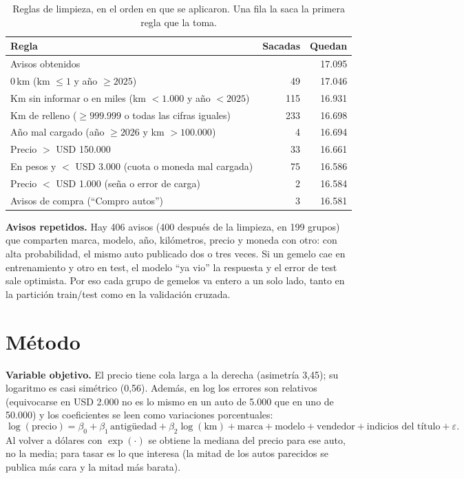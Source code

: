 \documentclass[11pt,a4paper]{article}
\begin{document}
\begin{table}[h]
\centering\small
\begin{tabular}{lrr}
\toprule
Regla & Sacadas & Quedan \\
\midrule
Avisos obtenidos                                               &     & 17.095 \\
0\,km (km $\le 1$ y año $\ge 2025$)                            &  49 & 17.046 \\
Km sin informar o en miles (km $< 1.000$ y año $< 2025$)       & 115 & 16.931 \\
Km de relleno ($\ge 999.999$ o todas las cifras iguales)       & 233 & 16.698 \\
Año mal cargado (año $\ge 2026$ y km $> 100.000$)              &   4 & 16.694 \\
Precio $>$ USD 150.000                                         &  33 & 16.661 \\
En pesos y $<$ USD 3.000 (cuota o moneda mal cargada)          &  75 & 16.586 \\
Precio $<$ USD 1.000 (seña o error de carga)                   &   2 & 16.584 \\
Avisos de compra (``Compro autos'')                            &   3 & 16.581 \\
\bottomrule
\end{tabular}
\caption{Reglas de limpieza, en el orden en que se aplicaron. Una fila la saca la primera regla que la toma.}
\label{tab:limpieza}
\end{table}

\textbf{Avisos repetidos.} Hay 406 avisos (400 después de la limpieza, en 199 grupos) que comparten
marca, modelo, año, kilómetros, precio y moneda con otro: con alta probabilidad, el mismo auto publicado dos o tres veces. Si un gemelo cae en
entrenamiento y otro en test, el modelo ``ya vio'' la respuesta y el error de test sale optimista. Por
eso cada grupo de gemelos va entero a un solo lado, tanto en la partición train/test como en la
validación cruzada.

\section{Método}

\textbf{Variable objetivo.} El precio tiene cola larga a la derecha (asimetría 3,45); su logaritmo es
casi simétrico (0,56). Además, en log los errores son relativos (equivocarse en USD 2.000 no es lo
mismo en un auto de 5.000 que en uno de 50.000) y los coeficientes se leen como variaciones porcentuales:
\[
\log(\text{precio}) = \beta_0 + \beta_1\,\text{antigüedad} + \beta_2 \log(\text{km})
+ \text{marca} + \text{modelo} + \text{vendedor} + \text{indicios del título} + \varepsilon .
\]
Al volver a dólares con $\exp(\cdot)$ se obtiene la mediana del precio para ese auto, no la media; para
tasar es lo que interesa (la mitad de los autos parecidos se publica más cara y la mitad más barata).
\end{document}
